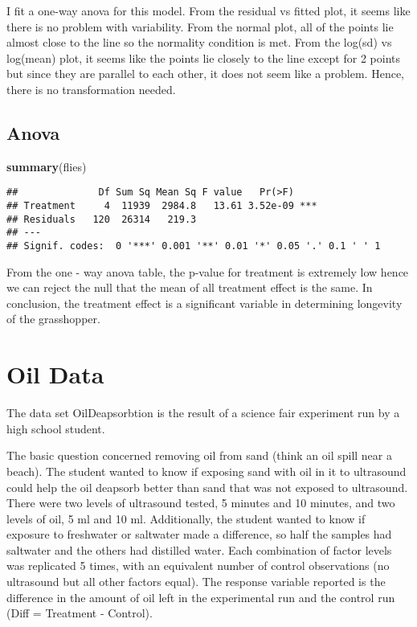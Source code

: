 \documentclass[]{article}
\newenvironment{Shaded}{\begin{snugshade}}{\end{snugshade}}
\newcommand{\KeywordTok}[1]{\textcolor[rgb]{0.13,0.29,0.53}{\textbf{#1}}}
\newcommand{\NormalTok}[1]{#1}
\begin{document}
I fit a one-way anova for this model. From the residual vs fitted plot,
it seems like there is no problem with variability. From the normal
plot, all of the points lie almost close to the line so the normality
condition is met. From the log(sd) vs log(mean) plot, it seems like the
points lie closely to the line except for 2 points but since they are
parallel to each other, it does not seem like a problem. Hence, there is
no transformation needed.

\hypertarget{anova-1}{%
\subsection{Anova}\label{anova-1}}

\begin{Shaded}
\begin{Highlighting}[]
\KeywordTok{summary}\NormalTok{(flies)}
\end{Highlighting}
\end{Shaded}

\begin{verbatim}
##              Df Sum Sq Mean Sq F value   Pr(>F)    
## Treatment     4  11939  2984.8   13.61 3.52e-09 ***
## Residuals   120  26314   219.3                     
## ---
## Signif. codes:  0 '***' 0.001 '**' 0.01 '*' 0.05 '.' 0.1 ' ' 1
\end{verbatim}

From the one - way anova table, the p-value for treatment is extremely
low hence we can reject the null that the mean of all treatment effect
is the same. In conclusion, the treatment effect is a significant
variable in determining longevity of the grasshopper.

\hypertarget{oil-data}{%
\section{Oil Data}\label{oil-data}}

The data set OilDeapsorbtion is the result of a science fair experiment
run by a high school student.

The basic question concerned removing oil from sand (think an oil spill
near a beach). The student wanted to know if exposing sand with oil in
it to ultrasound could help the oil deapsorb better than sand that was
not exposed to ultrasound. There were two levels of ultrasound tested, 5
minutes and 10 minutes, and two levels of oil, 5 ml and 10 ml.
Additionally, the student wanted to know if exposure to freshwater or
saltwater made a difference, so half the samples had saltwater and the
others had distilled water. Each combination of factor levels was
replicated 5 times, with an equivalent number of control observations
(no ultrasound but all other factors equal). The response variable
reported is the difference in the amount of oil left in the experimental
run and the control run (Diff = Treatment - Control).
\end{document}
